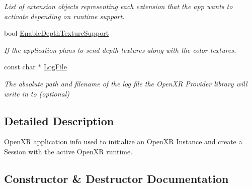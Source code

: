 \begin{DoxyCompactItemize}
\begin{DoxyCompactList}\small\item\em List of extension objects representing each extension that the app wants to activate depending on runtime support. \end{DoxyCompactList}\item 
bool \mbox{\hyperlink{struct_open_x_r_provider_1_1_x_r_app_info_a82ebc04bd67f8708e3925b282aeb71a2}{Enable\+Depth\+Texture\+Support}}
\begin{DoxyCompactList}\small\item\em If the application plans to send depth textures along with the color textures. \end{DoxyCompactList}\item 
const char $\ast$ \mbox{\hyperlink{struct_open_x_r_provider_1_1_x_r_app_info_a134d71f0d127123dc1b4b1682102b0ee}{Log\+File}}
\begin{DoxyCompactList}\small\item\em The absolute path and filename of the log file the Open\+XR Provider library will write in to (optional) \end{DoxyCompactList}\end{DoxyCompactItemize}


\subsection{Detailed Description}
Open\+XR application info used to initialize an Open\+XR Instance and create a Session with the active Open\+XR runtime. 

\subsection{Constructor \& Destructor Documentation}
\mbox{\label{struct_open_x_r_provider_1_1_x_r_app_info_a54ff47ab67f3c32aa6e2a8e48c8a982a}} 
